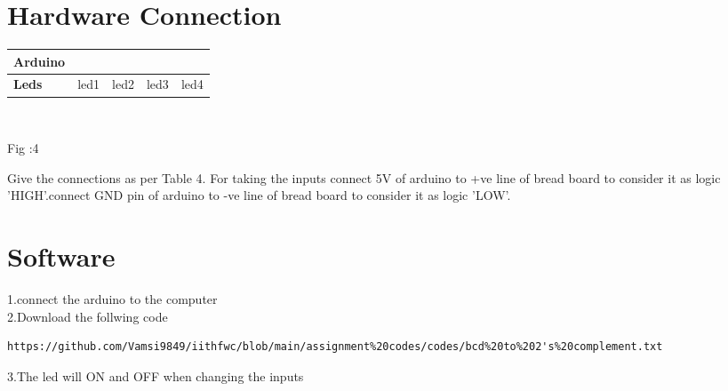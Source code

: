 \documentclass[10pt, a4paper]{article}
\begin{document}
     
    \section{Hardware Connection}


    
     \begin{tabularx}{0.4\textwidth} {  
  | >{\centering\arraybackslash}X
  | >{\centering\arraybackslash}X 
  | >{\centering\arraybackslash}X 
  | >{\centering\arraybackslash}X  
  | >{\centering\arraybackslash}X |}
  \hline
\textbf{Arduino} &  2  &  3  &  4  &  5\\
\hline
\textbf{Leds}    & led1 & led2 & led3 & led4\\
\hline
 \end{tabularx}\\

 \begin{center}
 Fig :4
   \end{center}




   Give the connections as per Table 4. For taking the inputs connect 5V of arduino to +ve line of bread board to consider it as logic 'HIGH'.connect GND pin of arduino to -ve line of bread board to consider it as logic 'LOW'.


    
    
 
 


  
  \section{Software}
  1.connect the arduino to the computer
  \\2.Download the follwing code
  
  \begin{lstlisting}
https://github.com/Vamsi9849/iithfwc/blob/main/assignment%20codes/codes/bcd%20to%202's%20complement.txt
  \end{lstlisting}
  3.The led will ON and OFF when changing the inputs




    

    
 
\end{document}
